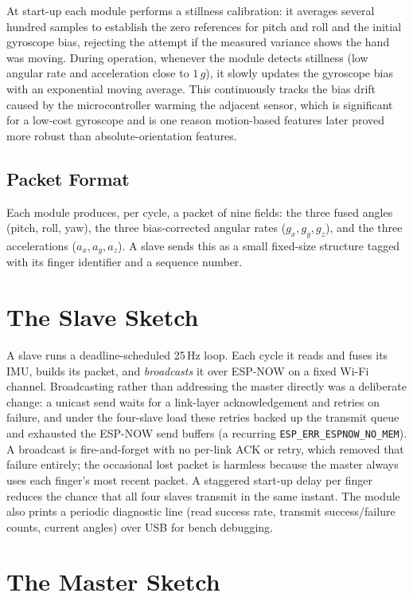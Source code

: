 At start-up each module performs a stillness calibration: it averages several
hundred samples to establish the zero references for pitch and roll and the
initial gyroscope bias, rejecting the attempt if the measured variance shows
the hand was moving. During operation, whenever the module detects stillness
(low angular rate and acceleration close to $1\,g$), it slowly updates the
gyroscope bias with an exponential moving average. This continuously tracks the
bias drift caused by the microcontroller warming the adjacent sensor, which is
significant for a low-cost gyroscope and is one reason motion-based features
later proved more robust than absolute-orientation features.

\subsection{Packet Format}

Each module produces, per cycle, a packet of nine fields: the three fused
angles (pitch, roll, yaw), the three bias-corrected angular rates
($g_x,g_y,g_z$), and the three accelerations ($a_x,a_y,a_z$). A slave sends
this as a small fixed-size structure tagged with its finger identifier and a
sequence number.

\section{The Slave Sketch}

A slave runs a deadline-scheduled 25\,Hz loop. Each cycle it reads and fuses
its IMU, builds its packet, and \emph{broadcasts} it over ESP-NOW on a fixed
Wi-Fi channel. Broadcasting rather than addressing the master directly was a
deliberate change: a unicast send waits for a link-layer acknowledgement and
retries on failure, and under the four-slave load these retries backed up the
transmit queue and exhausted the ESP-NOW send buffers (a recurring
\texttt{ESP\_ERR\_ESPNOW\_NO\_MEM}). A broadcast is fire-and-forget with no
per-link ACK or retry, which removed that failure entirely; the occasional lost
packet is harmless because the master always uses each finger's most recent
packet. A staggered start-up delay per finger reduces the chance that all four
slaves transmit in the same instant. The module also prints a periodic diagnostic line (read success rate,
transmit success/failure counts, current angles) over USB for bench debugging.

\section{The Master Sketch}

